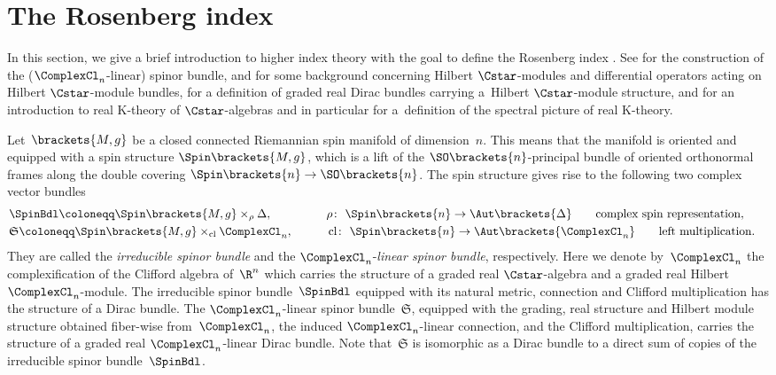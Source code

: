 \documentclass[10pt,a4paper]{amsart}
\numberwithin{equation}{section}
\newcommand{\ClSpinBdl}{\mathfrak{S}}
\begin{document}
\section{The Rosenberg index} \label{SectionRosenbergIndex}
%
In this section, we give a brief introduction to higher index theory with the goal to define the Rosenberg index \cite{Rosenberg1983}. See \cite{Lawson1989} for the construction of the ($\ComplexCl_n$-linear) spinor bundle, \cite{Lance1995} and \cite{Ebert2016} for some background concerning Hilbert $\Cstar$-modules and differential operators acting on Hilbert $\Cstar$-module bundles, \cite[Definition~2.1]{Tony2025} for a definition of graded real Dirac bundles carrying a~Hilbert $\Cstar$-module structure, and \cite{Roe} for an introduction to real K-theory of $\Cstar$-algebras and in particular for a~definition of the spectral picture of real K-theory.

Let~$\brackets{M,g}$ be a closed connected Riemannian spin manifold of dimension~$n$. This means that the manifold is oriented and equipped with a spin structure $\Spin\brackets{M,g}$, which is a lift of the $\SO\brackets{n}$-principal bundle of oriented orthonormal frames along the double covering $\Spin\brackets{n}\to \SO\brackets{n}$. The spin structure gives rise to the following two complex vector bundles
\begin{alignat*}{3}
& \SpinBdl\coloneqq \Spin\brackets{M,g}\times_{\rho} \Delta,\qquad&&
\rho\colon\ \Spin\brackets{n}\to \Aut\brackets{\Delta}\qquad
\text{complex spin representation},& \\
& \ClSpinBdl\coloneqq \Spin\brackets{M,g}\times_{\operatorname{cl}} \ComplexCl_n,\qquad&&
\operatorname{cl}\colon\ \Spin\brackets{n}\to \Aut\brackets{\ComplexCl_n}\qquad
\text{left multiplication}.
\end{alignat*}
They are called the \textit{irreducible spinor bundle} and the $\ComplexCl_n$-\textit{linear spinor bundle}, respectively. Here we denote by~$\ComplexCl_n$ the complexification of the Clifford algebra of~$\R^n$ which carries the structure of a graded real $\Cstar$-algebra and a graded real Hilbert $\ComplexCl_n$-module. The irreducible spinor bundle~$\SpinBdl$ equipped with its natural metric, connection and Clifford multiplication has the structure of a Dirac bundle. The $\ComplexCl_n$-linear spinor bundle~$\ClSpinBdl$, equipped with the grading, real structure and Hilbert module structure obtained fiber-wise from~$\ComplexCl_n$, the induced $\ComplexCl_n$-linear connection, and the Clifford multiplication, carries the structure of a graded real $\ComplexCl_n$-linear Dirac bundle. Note that~$\ClSpinBdl$ is isomorphic as a Dirac bundle to a direct sum of copies of the irreducible spinor bundle~$\SpinBdl$.
\end{document}
